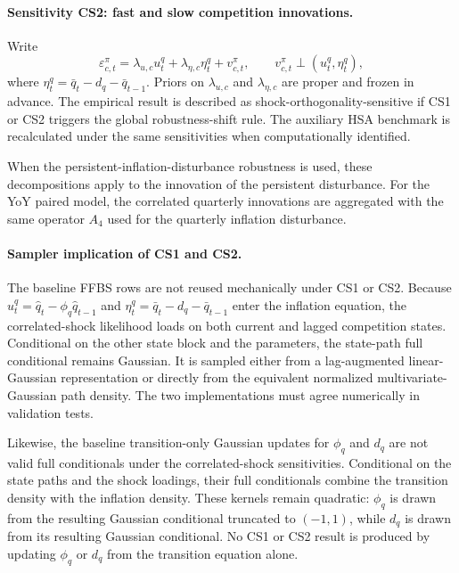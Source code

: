 \documentclass[11pt]{article}
\begin{document}
\paragraph{Sensitivity CS2: fast and slow competition innovations.}
Write
\begin{equation}
\varepsilon_{c,t}^{\pi}
=
\lambda_{u,c}u_t^q
+
\lambda_{\eta,c}\eta_t^q
+
v_{c,t}^{\pi},
\qquad
v_{c,t}^{\pi}\perp(u_t^q,\eta_t^q),
\label{eq:cs2}
\end{equation}
where $\eta_t^q=\bar q_t-d_q-\bar q_{t-1}$. Priors on $\lambda_{u,c}$ and $\lambda_{\eta,c}$ are proper and frozen in advance. The empirical result is described as shock-orthogonality-sensitive if CS1 or CS2 triggers the global robustness-shift rule. The auxiliary HSA benchmark is recalculated under the same sensitivities when computationally identified.

When the persistent-inflation-disturbance robustness is used, these decompositions apply to the innovation of the persistent disturbance. For the YoY paired model, the correlated quarterly innovations are aggregated with the same operator $A_4$ used for the quarterly inflation disturbance.

\paragraph{Sampler implication of CS1 and CS2.}
The baseline FFBS rows are not reused mechanically under CS1 or CS2. Because $u_t^q=\hat q_t-\phi_q\hat q_{t-1}$ and $\eta_t^q=\bar q_t-d_q-\bar q_{t-1}$ enter the inflation equation, the correlated-shock likelihood loads on both current and lagged competition states. Conditional on the other state block and the parameters, the state-path full conditional remains Gaussian. It is sampled either from a lag-augmented linear-Gaussian representation or directly from the equivalent normalized multivariate-Gaussian path density. The two implementations must agree numerically in validation tests.

Likewise, the baseline transition-only Gaussian updates for $\phi_q$ and $d_q$ are not valid full conditionals under the correlated-shock sensitivities. Conditional on the state paths and the shock loadings, their full conditionals combine the transition density with the inflation density. These kernels remain quadratic: $\phi_q$ is drawn from the resulting Gaussian conditional truncated to $(-1,1)$, while $d_q$ is drawn from its resulting Gaussian conditional. No CS1 or CS2 result is produced by updating $\phi_q$ or $d_q$ from the transition equation alone.
\end{document}
